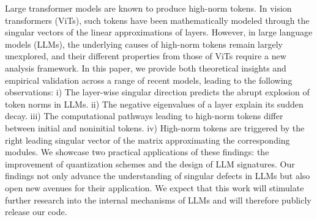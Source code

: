 Large transformer models are known to produce high-norm tokens.
In vision transformers (ViTs), such tokens have been mathematically modeled through the singular vectors of the linear approximations of layers.
However, in large language models (LLMs), the underlying causes of high-norm tokens remain largely unexplored, and their different properties from those of ViTs require a new analysis framework.
In this paper, we provide both theoretical insights and empirical validation across a range of recent models, leading to the following observations:
i) The layer-wise singular
direction predicts the abrupt explosion of token norms in LLMs.
ii) The negative eigenvalues of a layer explain its sudden decay.
iii) The computational pathways leading to high-norm tokens differ between initial and noninitial tokens.
iv) High-norm tokens are triggered by the right leading singular vector of the matrix approximating the corresponding modules.
We showcase two practical applications of these findings: the improvement of quantization schemes and the design of LLM signatures. Our findings not only advance the understanding of singular defects in LLMs but also open new avenues for their application. We expect that this work will stimulate further research into the internal mechanisms of LLMs
and will therefore publicly release our code.
